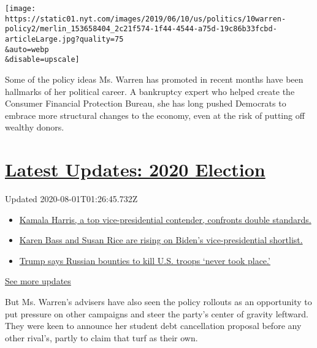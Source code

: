\texttt{[image: https://static01.nyt.com/images/2019/06/10/us/politics/10warren-policy2/merlin\_153658404\_2c21f574-1f44-4544-a75d-19c86b33fcbd-articleLarge.jpg?quality=75\\\&auto=webp\\\&disable=upscale]}

Some of the policy ideas Ms. Warren has promoted in recent months have
been hallmarks of her political career. A bankruptcy expert who helped
create the Consumer Financial Protection Bureau, she has long pushed
Democrats to embrace more structural changes to the economy, even at the
risk of putting off wealthy donors.

\hypertarget{latest-updates-2020-election}{%
\section{\texorpdfstring{\href{https://www.nytimes.com/2020/07/31/us/elections/biden-vs-trump.html?action=click\&pgtype=Article\&state=default\&region=MAIN_CONTENT_1\&context=storylines_live_updates}{Latest
Updates: 2020
Election}}{Latest Updates: 2020 Election}}\label{latest-updates-2020-election}}

Updated 2020-08-01T01:26:45.732Z

\begin{itemize}
\tightlist
\item
  \href{https://www.nytimes.com/2020/07/31/us/elections/biden-vs-trump.html?action=click\&pgtype=Article\&state=default\&region=MAIN_CONTENT_1\&context=storylines_live_updates\#link-29fdff45}{Kamala
  Harris, a top vice-presidential contender, confronts double
  standards.}
\item
  \href{https://www.nytimes.com/2020/07/31/us/elections/biden-vs-trump.html?action=click\&pgtype=Article\&state=default\&region=MAIN_CONTENT_1\&context=storylines_live_updates\#link-13ec3d9c}{Karen
  Bass and Susan Rice are rising on Biden's vice-presidential
  shortlist.}
\item
  \href{https://www.nytimes.com/2020/07/31/us/elections/biden-vs-trump.html?action=click\&pgtype=Article\&state=default\&region=MAIN_CONTENT_1\&context=storylines_live_updates\#link-49e9a016}{Trump
  says Russian bounties to kill U.S. troops `never took place.'}
\end{itemize}

\href{https://www.nytimes.com/2020/07/31/us/elections/biden-vs-trump.html?action=click\&pgtype=Article\&state=default\&region=MAIN_CONTENT_1\&context=storylines_live_updates}{See
more updates}

But Ms. Warren's advisers have also seen the policy rollouts as an
opportunity to put pressure on other campaigns and steer the party's
center of gravity leftward. They were keen to announce her student debt
cancellation proposal before any other rival's, partly to claim that
turf as their own.

